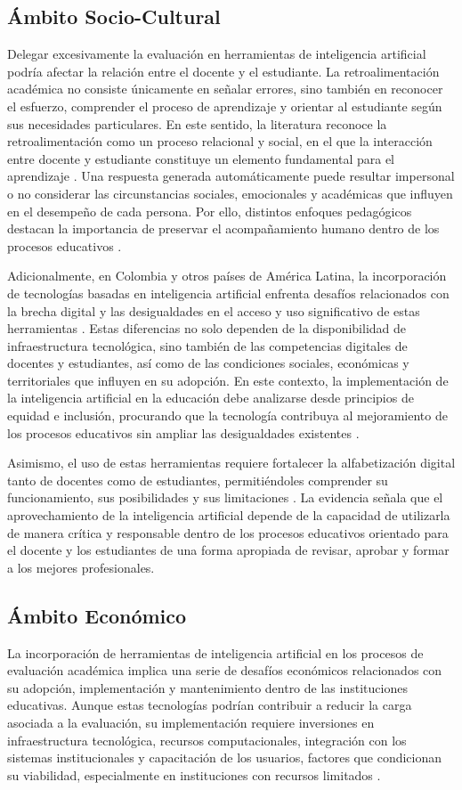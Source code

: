 \documentclass[letterpaper, 10 pt, conference]{ieeeconf}  %
\begin{document}
    \subsection{Ámbito Socio-Cultural}
    Delegar excesivamente la evaluación en herramientas de inteligencia artificial podría afectar la relación entre el docente y el estudiante. La retroalimentación académica no consiste únicamente en señalar errores, sino también en reconocer el esfuerzo, comprender el proceso de aprendizaje y orientar al estudiante según sus necesidades particulares. En este sentido, la literatura reconoce la retroalimentación como un proceso relacional y social, en el que la interacción entre docente y estudiante constituye un elemento fundamental para el aprendizaje \cite{20}. Una respuesta generada automáticamente puede resultar impersonal o no considerar las circunstancias sociales, emocionales y académicas que influyen en el desempeño de cada persona. Por ello, distintos enfoques pedagógicos destacan la importancia de preservar el acompañamiento humano dentro de los procesos educativos \cite{18}.

    Adicionalmente, en Colombia y otros países de América Latina, la incorporación de tecnologías basadas en inteligencia artificial enfrenta desafíos relacionados con la brecha digital y las desigualdades en el acceso y uso significativo de estas herramientas \cite{11}. Estas diferencias no solo dependen de la disponibilidad de infraestructura tecnológica, sino también de las competencias digitales de docentes y estudiantes, así como de las condiciones sociales, económicas y territoriales que influyen en su adopción. En este contexto, la implementación de la inteligencia artificial en la educación debe analizarse desde principios de equidad e inclusión, procurando que la tecnología contribuya al mejoramiento de los procesos educativos sin ampliar las desigualdades existentes \cite{21}.

    Asimismo, el uso de estas herramientas requiere fortalecer la alfabetización digital tanto de docentes como de estudiantes, permitiéndoles comprender su funcionamiento, sus posibilidades y sus limitaciones \cite{22}. La evidencia señala que el aprovechamiento de la inteligencia artificial depende de la capacidad de utilizarla de manera crítica y responsable dentro de los procesos educativos orientado para el docente y los estudiantes de una forma apropiada de revisar, aprobar y formar a los mejores profesionales.

    \subsection{Ámbito Económico} 
    La incorporación de herramientas de inteligencia artificial en los procesos de evaluación académica implica una serie de desafíos económicos relacionados con su adopción, implementación y mantenimiento dentro de las instituciones educativas. Aunque estas tecnologías podrían contribuir a reducir la carga asociada a la evaluación, su implementación requiere inversiones en infraestructura tecnológica, recursos computacionales, integración con los sistemas institucionales y capacitación de los usuarios, factores que condicionan su viabilidad, especialmente en instituciones con recursos limitados \cite{23}.
\end{document}
